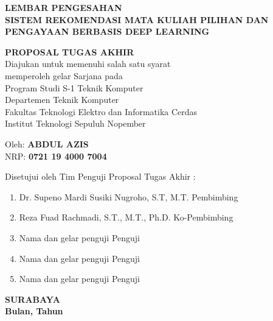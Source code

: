 {
\begin{center}
    \uppercase{\textbf{\large Lembar Pengesahan}} \\

    \vspace*{10mm}
    \uppercase{\textbf{Sistem rekomendasi Mata Kuliah Pilihan dan Pengayaan berbasis Deep Learning}}
    \vspace*{10mm}

    {
        \uppercase{\textbf{Proposal Tugas Akhir}} \\
        Diajukan untuk memenuhi salah satu syarat          \\
        memperoleh gelar Sarjana pada                      \\
        Program Studi S-1 Teknik Komputer                  \\
        Departemen Teknik Komputer                         \\
        Fakultas Teknologi Elektro dan Informatika Cerdas  \\
        Institut Teknologi Sepuluh Nopember                \\
    }

    \vspace*{1.5cm}
    Oleh: \textbf{\uppercase{Abdul Azis}}                          \\
    NRP: \textbf{0721 19 4000 7004}                    \\
    \vspace*{1.5cm}

    Disetujui oleh Tim Penguji Proposal Tugas Akhir :  \\
    \vspace*{5mm}

    \begin{enumerate}
        \setlength\itemsep{1.5em}
        \item Dr. Supeno Mardi Susiki Nugroho, S.T, M.T. \hfill Pembimbing
        \item Reza Fuad Rachmadi, S.T., M.T., Ph.D. \hfill Ko-Pembimbing
        \item Nama dan gelar penguji \hfill Penguji
        \item Nama dan gelar penguji \hfill Penguji
        \item Nama dan gelar penguji \hfill Penguji
    \end{enumerate}

    \vspace*{1.5cm}
    \uppercase{\textbf{surabaya}}                      \\
    \textbf{Bulan, Tahun}                              \\
\end{center}
}
